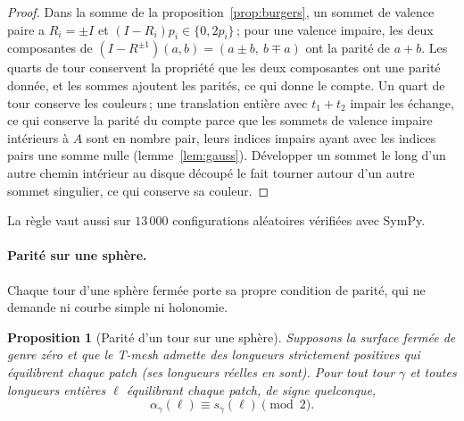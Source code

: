 \documentclass[11pt,a4paper]{article}
\newtheorem{proposition}{Proposition}
\newcommand{\shift}{s}
\newcommand{\lean}[1]{\texttt{\detokenize{#1}}}
\newenvironment{evidence}[3][]{}{}
\begin{document}
\begin{proof}
Dans la somme de la proposition~\ref{prop:burgers}, un sommet de valence paire
a $R_i = \pm I$ et $(I - R_i)p_i \in \{0, 2p_i\}$\,; pour une valence
impaire, les deux composantes de $(I - R^{\pm1})(a, b) = (a \pm b,\ b \mp a)$
ont la parité de $a + b$. Les quarts de tour conservent la propriété que les
deux composantes ont une parité donnée, et les sommes ajoutent les parités, ce
qui donne le compte. Un quart de tour conserve les couleurs\,; une translation
entière avec $t_1 + t_2$ impair les échange, ce qui conserve la parité du
compte parce que les sommets de valence impaire intérieurs à $A$ sont en
nombre pair, leurs indices impairs ayant avec les indices pairs une somme
nulle (lemme~\ref{lem:gauss}). Développer un sommet le long d'un autre chemin
intérieur au disque découpé le fait tourner autour d'un autre sommet
singulier, ce qui conserve sa couleur.
\end{proof}

La règle vaut aussi sur $13\,000$ configurations aléatoires vérifiées avec
SymPy.

\paragraph{Parité sur une sphère.}
Chaque tour d'une sphère fermée porte sa propre condition de parité, qui ne
demande ni courbe simple ni holonomie.

\begin{evidence}{lean}{\lean{TMesh.parity_of_turn_sphere}, à partir de \lean{TMesh.bipartite_of_sphere} (le graphe des quads d'un T-mesh connexe à $P - A + N = 2$ est biparti, par \lean{QuadSurface.bipartite_of_euler} et \lean{TMesh.eulerQuad_eq_nodeCount}) et de \lean{TMesh.parity_of_turn_of_colouring}\,; la sphère est $P - A + N = 2$ et connexe, et la marche suit le tour à toutes longueurs entières équilibrées strictement positives\,; testé~: \lean{TMesh.IsColouring} décidé sur les 35 sphères de 50 instances aléatoires, 4\,388 tours}
\begin{proposition}[Parité d'un tour sur une sphère]\label{prop:parity}
Supposons la surface fermée de genre zéro et que le T-mesh admette des
longueurs strictement positives qui équilibrent chaque patch (ses longueurs
réelles en sont). Pour tout tour $\gamma$ et toutes longueurs entières $\ell$
équilibrant chaque patch, de signe quelconque,
\[
  \alpha_\gamma(\ell) \equiv \shift_\gamma(\ell) \pmod 2 .
\]
\end{proposition}
\end{evidence}
\end{document}
